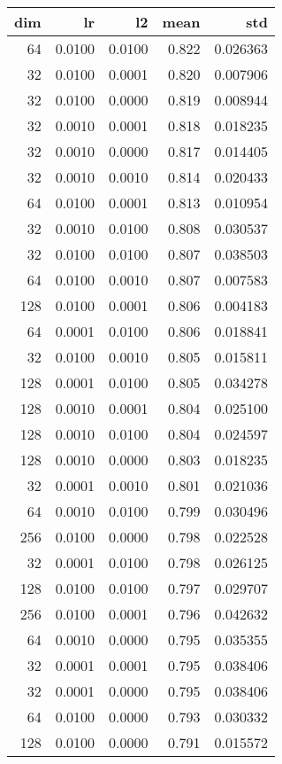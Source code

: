 \begin{tabular}{rrrrr}
\toprule
 dim &      lr &      l2 &   mean &       std \\
\midrule
  64 &  0.0100 &  0.0100 &  0.822 &  0.026363 \\
  32 &  0.0100 &  0.0001 &  0.820 &  0.007906 \\
  32 &  0.0100 &  0.0000 &  0.819 &  0.008944 \\
  32 &  0.0010 &  0.0001 &  0.818 &  0.018235 \\
  32 &  0.0010 &  0.0000 &  0.817 &  0.014405 \\
  32 &  0.0010 &  0.0010 &  0.814 &  0.020433 \\
  64 &  0.0100 &  0.0001 &  0.813 &  0.010954 \\
  32 &  0.0010 &  0.0100 &  0.808 &  0.030537 \\
  32 &  0.0100 &  0.0100 &  0.807 &  0.038503 \\
  64 &  0.0100 &  0.0010 &  0.807 &  0.007583 \\
 128 &  0.0100 &  0.0001 &  0.806 &  0.004183 \\
  64 &  0.0001 &  0.0100 &  0.806 &  0.018841 \\
  32 &  0.0100 &  0.0010 &  0.805 &  0.015811 \\
 128 &  0.0001 &  0.0100 &  0.805 &  0.034278 \\
 128 &  0.0010 &  0.0001 &  0.804 &  0.025100 \\
 128 &  0.0010 &  0.0100 &  0.804 &  0.024597 \\
 128 &  0.0010 &  0.0000 &  0.803 &  0.018235 \\
  32 &  0.0001 &  0.0010 &  0.801 &  0.021036 \\
  64 &  0.0010 &  0.0100 &  0.799 &  0.030496 \\
 256 &  0.0100 &  0.0000 &  0.798 &  0.022528 \\
  32 &  0.0001 &  0.0100 &  0.798 &  0.026125 \\
 128 &  0.0100 &  0.0100 &  0.797 &  0.029707 \\
 256 &  0.0100 &  0.0001 &  0.796 &  0.042632 \\
  64 &  0.0010 &  0.0000 &  0.795 &  0.035355 \\
  32 &  0.0001 &  0.0001 &  0.795 &  0.038406 \\
  32 &  0.0001 &  0.0000 &  0.795 &  0.038406 \\
  64 &  0.0100 &  0.0000 &  0.793 &  0.030332 \\
 128 &  0.0100 &  0.0000 &  0.791 &  0.015572 \\

\end{tabular}
